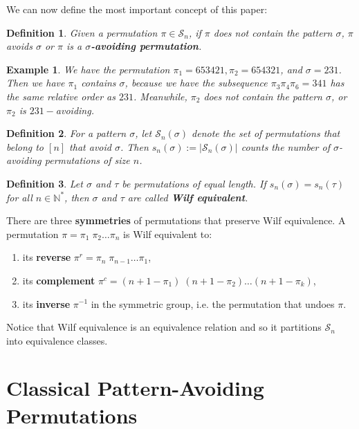 \documentclass[12pt]{article}
\newcommand{\sym}{\mathcal S}
\newtheorem{defn}{Definition} %
\newtheorem{ex}{Example} %
\begin{document}
We can now define the most important concept of this paper:
\begin{defn}
Given a permutation $\pi \in \mathcal{S}_n$, if $\pi$ does not contain the pattern $\sigma$, $\pi$ avoids $\sigma$ or $\pi$ is a \textbf{$\sigma$-avoiding permutation}.\cite{elizalde2004}
\end{defn}

\begin{ex}
    We have the permutation $\pi_1 = 653421, \pi_2=654321$, and $\sigma = 231$. Then we have $\pi_1$ contains $\sigma$, because we have the subsequence $\pi_3\pi_4\pi_6=341$ has the same relative order as $231$. Meanwhile, $\pi_2$ does not contain the pattern $\sigma$, or $\pi_2$ is $231-$avoiding.   
\end{ex}

\begin{defn}
For a pattern $\sigma$, let $\mathcal{S}_n(\sigma)$ denote the set of permutations that belong to $[n]$ that avoid $\sigma$. Then $s_n(\sigma):=|\mathcal{S}_n(\sigma)|$ counts the number of $\sigma$-avoiding permutations of size $n$. 
\end{defn}
\begin{defn}
    Let $\sigma$ and $\tau$ be permutations of equal length. If $s_n(\sigma)=s_n(\tau)$ for all $n \in \mathbb{N}^*$, then $\sigma$ and $\tau$ are called \textbf{Wilf equivalent}.
\end{defn}

There are three \textbf{symmetries} of permutations that preserve Wilf equivalence. A permutation $\pi =\pi_1\;\pi_2\dots \pi_n$ is Wilf equivalent to:
\begin{enumerate}
    \item its \textbf{reverse} $\pi^r=\pi_n\;\pi_{n-1}\dots \pi_1$,
    \item its \textbf{complement} $\pi^c=(n+1-\pi_1)\;(n+1-\pi_2)\dots(n+1-\pi_k)$,
    \item its \textbf{inverse} $\pi^{-1}$ in the symmetric group, i.e. the permutation that undoes $\pi$. %
\end{enumerate}
Notice that Wilf equivalence is an equivalence relation and so it partitions $\sym_n$ into equivalence classes.

\section{Classical Pattern-Avoiding Permutations}
\end{document}
